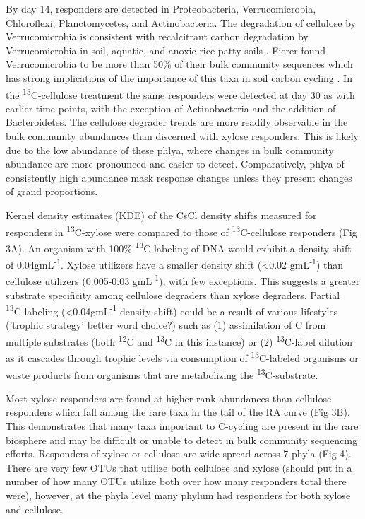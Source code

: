 By day 14, responders are detected in Proteobacteria, Verrucomicrobia, Chloroflexi, Planctomycetes, and Actinobacteria. The degradation of cellulose by Verrucomicrobia is consistent with recalcitrant carbon degradation by Verrucomicrobia in soil, aquatic, and anoxic rice patty soils \cite{Fierer_2013,Herlemann_2013,10543821}. Fierer found Verrucomicrobia to be more than 50\% of their bulk community sequences which has strong implications of the importance of this taxa in soil carbon cycling \cite{Fierer_2013}. In the \textsuperscript{13}C-cellulose treatment the same responders were detected at day 30 as with earlier time points, with the exception of Actinobacteria and the addition of Bacteroidetes. The cellulose degrader trends are more readily observable in the bulk community abundances than discerned with xylose responders. This is likely due to the low abundance of these phlya, where changes in bulk community abundance are more pronounced and easier to detect. Comparatively, phlya of consistently high abundance mask response changes unless they present changes of grand proportions.          

Kernel density estimates (KDE) of the CsCl density shifts measured for responders in \textsuperscript{13}C-xylose were compared to those of \textsuperscript{13}C-cellulose responders (Fig 3A). An organism with 100\% \textsuperscript{13}C-labeling of DNA would exhibit a density shift of 0.04gmL\textsuperscript{-1}. Xylose utilizers have a smaller density shift (<0.02 gmL\textsuperscript{-1}) than cellulose utilizers (0.005-0.03 gmL\textsuperscript{-1}), with few exceptions. This suggests a greater substrate specificity among cellulose degraders than xylose degraders. Partial \textsuperscript{13}C-labeling (<0.04gmL\textsuperscript{-1} density shift) could be a result of various lifestyles ('trophic strategy' better word choice?) such as (1) assimilation of C from multiple substrates (both \textsuperscript{12}C and \textsuperscript{13}C in this instance) or (2) \textsuperscript{13}C-label dilution as it cascades through trophic levels via consumption of \textsuperscript{13}C-labeled organisms or waste products from organisms that are metabolizing the \textsuperscript{13}C-substrate.

Most xylose responders are found at higher rank abundances than cellulose responders which fall among the rare taxa in the tail of the RA curve (Fig 3B). This demonstrates that many taxa important to C-cycling are present in the rare biosphere and may be difficult or unable to detect in bulk community sequencing efforts. Responders of xylose or cellulose are wide spread across 7 phyla (Fig 4). There are very few OTUs that utilize both cellulose and xylose (should put in a number of how many OTUs utilize both over how many responders total there were), however, at the phyla level many phylum had responders for both xylose and cellulose. 


